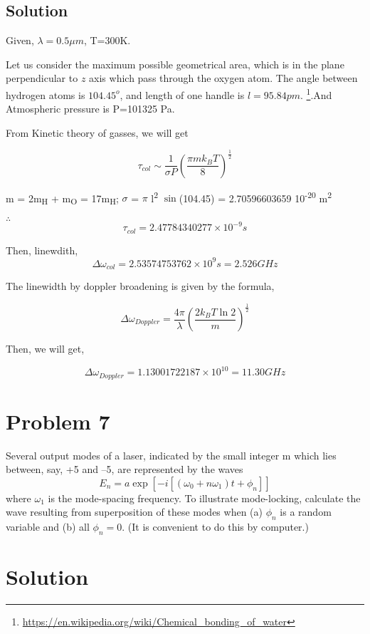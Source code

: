 \documentclass[a4paper,11pt]{article}
\begin{document}
\subsection*{Solution}
\label{sec:org68abc7e}
Given, \(\lambda = 0.5\mu m\), T=300K.

Let us consider the maximum possible geometrical area, which is in the plane perpendicular to \(z\) axis which pass through the oxygen atom. The angle between hydrogen atoms is \(104.45^o\), and length of one handle is \(l=95.84 pm\). \footnote{\url{https://en.wikipedia.org/wiki/Chemical\_bonding\_of\_water}}.And Atmospheric pressure is P=101325 Pa.

From Kinetic theory of gasses, we will get

\begin{equation}
\label{eq:org1946e84}
\tau_{col} \sim \frac{1}{\sigma P} \left(\frac{\pi m k_B T}{8}\right)^{\frac{1}{2}}
\end{equation}

m = 2m\textsubscript{H} + m\textsubscript{O} = 17m\textsubscript{H};
\(\sigma\) = \(\pi\) l\textsuperscript{2} \(\sin\)(104.45) = 2.70596603659\texttimes{} 10\textsuperscript{-20} m\textsuperscript{2} 

\(\therefore\)
$$\tau_{col} = 2.47784340277\times10^{-9}s$$

Then, linewdith, $$\Delta\omega_{col} = 2.53574753762\times10^9 s= 2.526 GHz$$

The linewidth by doppler broadening is given by the formula,

\begin{equation}
\label{eq:org1a9970c}
\Delta\omega_{Doppler} = \frac{4\pi}{\lambda} \left(\frac{2 k_B T  \ln 2}{m}\right)^{\frac{1}{2}} 
\end{equation}

Then, we will get,

$$\Delta\omega_{Doppler} = 1.13001722187\times 10^{10} = 11.30 GHz$$

\section*{Problem 7}
\label{sec:org4909ea1}
Several output modes of a laser, indicated by the small integer m which lies between, say, +5 and –5, are represented by the waves 
\begin{equation}
E_n=a\exp\left[-i[(\omega_0+n\omega_1)t+\phi_n]\right]
\end{equation}
where \(\omega_1\) is the mode-spacing frequency. To illustrate mode-locking, calculate the wave resulting from superposition of these modes when (a) \(\phi_n\) is a random variable and (b) all \(\phi_n = 0\). (It is convenient to do this by computer.) 
\section*{Solution}
\label{sec:orgd416e9f}
\end{document}
